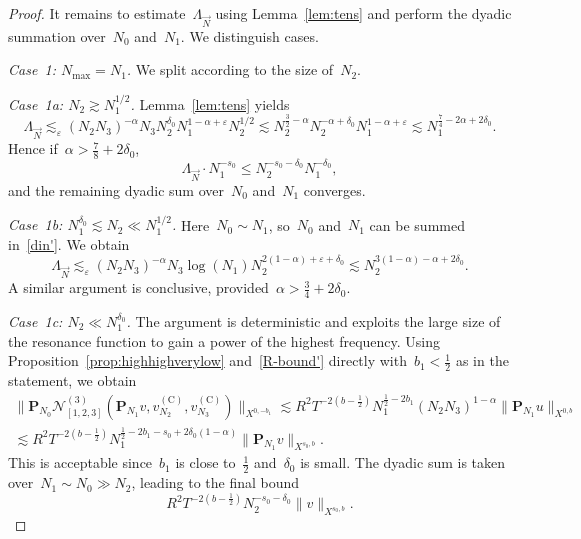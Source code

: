 \documentclass[11pt,reqno,english]{amsart}
\numberwithin{equation}{section}
\theoremstyle{plain}
\theoremstyle{definition}
\theoremstyle{remark}
\begin{document}
\begin{proof}
		It remains to estimate~$\Lambda_{\vec{N}}$ using Lemma~\ref{lem:tens} and perform the dyadic summation over~$N_0$ and~$N_1$.
		We distinguish cases.
		
		\emph{Case~1: $N_{\max}=N_{1}$.}
		We split according to the size of~$N_{2}$.
		
		\emph{Case~1a: $N_{2}\gtrsim N_{1}^{1/2}$.}
		Lemma~\ref{lem:tens} yields
		\[
		\Lambda_{\vec{N}}
		\lesssim_{\varepsilon}
		(N_{2}N_{3})^{-\alpha}
		N_{3}
		N_{2}^{\delta_0}
		N_{1}^{1-\alpha+\varepsilon}
		N_{2}^{1/2}\lesssim N_2^{\frac{3}{2}-\alpha}N_2^{-\alpha+\delta_0}N_1^{1-\alpha+\varepsilon}
		\lesssim
		N_{1}^{\frac{7}{4}-2\alpha+2\delta_0}.
		\]
		Hence if~$\alpha>\frac{7}{8}+2\delta_0$,
		\[
		\Lambda_{\vec{N}}\cdot N_1^{-s_0}\leq N_2^{-s_0-\delta_0}N_1^{-\delta_0},
		\]
		and the remaining dyadic sum over~$N_0$ and~$N_1$ converges.
		
		\emph{Case~1b: $N_{1}^{\delta_0}\lesssim N_{2}\ll N_{1}^{1/2}$.}
		Here~$N_{0}\sim N_{1}$, so~$N_{0}$ and~$N_{1}$ can be summed in~\eqref{din'}.
		We obtain
		\[
		\Lambda_{\vec{N}}
		\lesssim_{\varepsilon}
		(N_{2}N_{3})^{-\alpha}
		N_{3}\log(N_{1})
		N_{2}^{2(1-\alpha)+\varepsilon+\delta_0}
		\lesssim
		N_{2}^{3(1-\alpha)-\alpha+2\delta_0}.
		\]
		A similar argument is conclusive, provided~$\alpha>\frac{3}{4}+2\delta_0$.
		
		\emph{Case~1c: $N_{2}\ll N_{1}^{\delta_0}$.}
		The argument is deterministic and exploits the large size of the resonance function to gain a power of the highest frequency.
		Using Proposition~\ref{prop:highhighverylow} and~\eqref{R-bound'} directly with~$b_{1}<\frac{1}{2}$ as in the statement, we obtain
		\begin{multline*}
			\|
			\mathbf{P}_{N_{0}}
			\mathcal{N}_{[1,2,3]}^{(3)}
			(\mathbf{P}_{N_{1}}v,v_{N_2}^{(\mathrm{C})},v_{N_{3}}^{(\mathrm{C})})
			\|_{X^{0,-b_{1}}}
			\lesssim
			R^{2}T^{-2(b-\frac12)}
			N_{1}^{\frac12-2b_{1}}
			(N_{2}N_{3})^{1-\alpha}
			\|\mathbf{P}_{N_{1}}u\|_{X^{0,b}}
			\\
			\lesssim
			R^{2}T^{-2(b-\frac12)}
			N_{1}^{\frac12-2b_{1}-s_0+2\delta_0(1-\alpha)}\|\mathbf{P}_{N_1}v\|_{X^{s_0,b}}.
		\end{multline*}
		This is acceptable since~$b_{1}$ is close to~$\tfrac12$ and~$\delta_0$ is small.
		The dyadic sum is taken over~$N_1\sim N_0\gg N_2$, leading to the final bound
		\[
		R^2T^{-2(b-\frac{1}{2})}N_2^{-s_0-\delta_0}\|v\|_{X^{s_0,b}}.
		\]
		

\end{proof}
\end{document}

